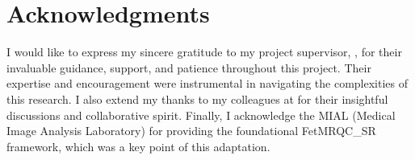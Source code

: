\chapter*{Acknowledgments}
\minitoc %

I would like to express my sincere gratitude to my project supervisor, \Advisor, for their invaluable guidance, support, and patience throughout this project. Their expertise and encouragement were instrumental in navigating the complexities of this research. 
I also extend my thanks to my colleagues at \AdvisorResearchUnit for their insightful discussions and collaborative spirit. 
Finally, I acknowledge the MIAL (Medical Image Analysis Laboratory) for providing the foundational FetMRQC\_SR framework, which was a key point of this adaptation.

